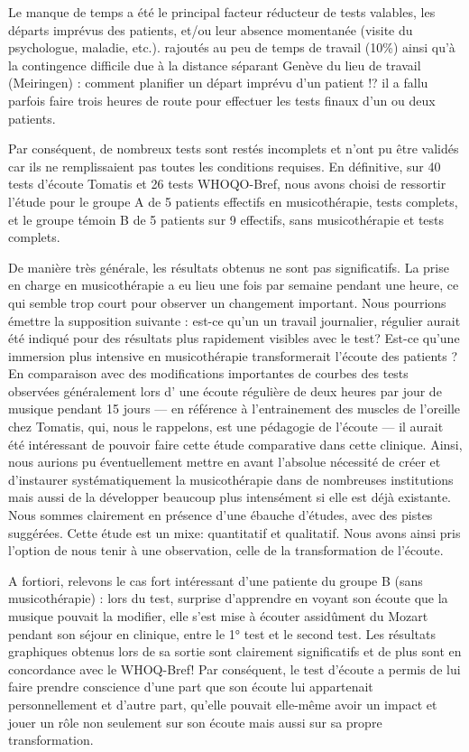 Le manque de temps a été le principal facteur  réducteur
de tests valables, les départs imprévus des patients, et/ou leur
absence momentanée (visite du psychologue, maladie, etc.). rajoutés au peu de temps de travail (10\%) ainsi qu'à la
contingence difficile due à la distance séparant Genève du lieu de travail (Meiringen)
: comment planifier un départ imprévu d'un patient !? il a fallu parfois
faire trois heures de route pour effectuer les tests finaux d'un ou deux
patients.
  
Par conséquent,  de nombreux tests sont restés 
incomplets et n'ont pu
être validés car ils ne remplissaient pas toutes les conditions requises.  En définitive, sur 40 tests d'écoute Tomatis et 26 tests
WHOQO-Bref, nous avons choisi de ressortir l'étude pour le groupe A de
5 patients effectifs en musicothérapie, tests complets, et le groupe
témoin B de 5 patients sur 9 effectifs, sans musicothérapie et tests
complets. 
 

  

  
  De manière très générale, les résultats obtenus ne
  sont pas significatifs.  La prise en charge en musicothérapie a eu lieu
  une fois par semaine pendant une heure, ce qui semble trop court pour observer un changement important. Nous pourrions émettre la supposition suivante :  est-ce qu'un un travail journalier, régulier aurait été indiqué pour des résultats plus rapidement visibles avec le test?
  Est-ce qu'une immersion plus intensive en musicothérapie transformerait l'écoute des patients ? 
   En comparaison avec des
  modifications importantes de courbes des tests observées généralement  lors d' une écoute
  régulière de deux heures par jour de musique pendant 15 jours --- en référence à l'entrainement des muscles de l'oreille chez Tomatis, qui, nous le rappelons, est une pédagogie de l'écoute --- il aurait été intéressant de pouvoir faire cette étude comparative dans cette clinique. Ainsi, nous aurions pu éventuellement mettre en avant  l'absolue nécessité de créer et d'instaurer systématiquement la musicothérapie dans de nombreuses institutions mais aussi  de la développer beaucoup plus intensément  si elle est déjà existante.
  Nous sommes clairement en présence d'une ébauche d'études, avec des pistes
  suggérées. 
  Cette étude est un mixe: quantitatif et qualitatif. Nous avons ainsi pris l'option de nous tenir à une
  observation, celle de la transformation de l'écoute.
  
  A fortiori, relevons le cas fort intéressant  d'une patiente du groupe B (sans
  musicothérapie) : lors du test, surprise d'apprendre en voyant son écoute que la musique pouvait la modifier, elle s'est mise à écouter assidûment du Mozart pendant son séjour en clinique, entre le 1° test et le second test.  Les résultats
  graphiques obtenus lors de sa sortie sont clairement significatifs
  et de plus sont en concordance avec le WHOQ-Bref!  
  Par conséquent, le test d'écoute a permis de lui faire prendre conscience d'une part que son écoute lui appartenait personnellement et d'autre part, qu'elle pouvait elle-même avoir un impact et jouer un rôle non seulement sur son écoute mais aussi sur sa propre  transformation.



